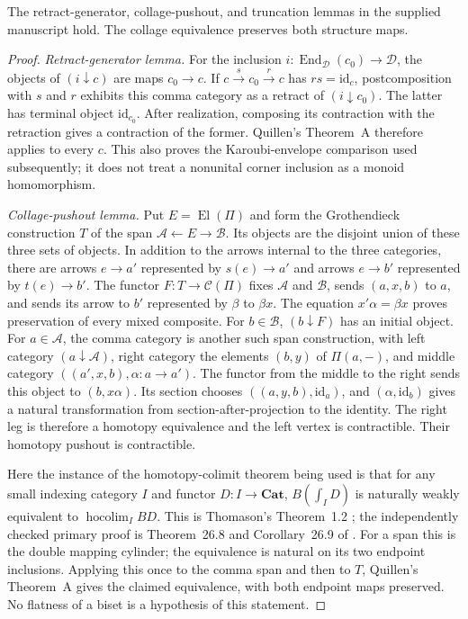 \begin{lemma}\label{lem:B-prelim}
The retract-generator, collage-pushout, and truncation lemmas in the
supplied manuscript hold.  The collage equivalence preserves both
structure maps.
\end{lemma}
\begin{proof}
\emph{Retract-generator lemma.}  For the inclusion
$i:\operatorname{End}_{\mathcal D}(c_0)\to\mathcal D$, the objects of
$(i\downarrow c)$ are maps $c_0\to c$.  If
$c\xrightarrow{s}c_0\xrightarrow{r}c$ has $rs=\mathrm{id}_c$,
postcomposition with $s$ and $r$ exhibits this comma category as a
retract of $(i\downarrow c_0)$.  The latter has terminal object
$\mathrm{id}_{c_0}$.  After realization, composing its contraction with
the retraction gives a contraction of the former.  Quillen's Theorem~A
therefore applies to every $c$.  This also proves the Karoubi-envelope
comparison used subsequently; it does not treat a nonunital corner
inclusion as a monoid homomorphism.

\emph{Collage-pushout lemma.}  Put $E=\operatorname{El}(\Pi)$ and form
the Grothendieck construction $T$ of the span
$\mathcal A\leftarrow E\to\mathcal B$.  Its objects are the disjoint
union of these three sets of objects.  In addition to the arrows internal
to the three categories, there are arrows $e\to a'$ represented by
$s(e)\to a'$ and arrows $e\to b'$ represented by $t(e)\to b'$.
The functor $F:T\to\mathcal C(\Pi)$ fixes $\mathcal A$ and
$\mathcal B$, sends $(a,x,b)$ to $a$, and sends its arrow to $b'$
represented by $\beta$ to $\beta x$.  The equation
$x'\alpha=\beta x$ proves preservation of every mixed composite.
For $b\in\mathcal B$, $(b\downarrow F)$ has an initial object.
For $a\in\mathcal A$, the comma category is another such span
construction, with left category $(a\downarrow\mathcal A)$,
right category the elements $(b,y)$ of $\Pi(a,-)$, and middle category
$((a',x,b),\alpha:a\to a')$.  The functor from the middle to the right
sends this object to $(b,x\alpha)$.  Its section chooses
$((a,y,b),\mathrm{id}_a)$, and $(\alpha,\mathrm{id}_b)$ gives a
natural transformation from section-after-projection to the identity.
The right leg is therefore a homotopy equivalence and the left vertex is
contractible.  Their homotopy pushout is contractible.

Here the instance of the homotopy-colimit theorem being used is that
for any small indexing category $I$ and functor $D:I\to\mathbf{Cat}$,
$B(\int_I D)$ is naturally weakly equivalent to
$\operatorname{hocolim}_I BD$.  This is Thomason's Theorem~1.2
\cite{Thomason1979B}; the independently checked primary proof is
Theorem~26.8 and Corollary~26.9 of \cite{ChacholskiScherer2002B}.
For a span this is the double mapping
cylinder; the equivalence is natural on its two endpoint inclusions.
Applying this once to the comma span and then to $T$, Quillen's
Theorem~A gives the claimed equivalence, with both endpoint maps
preserved.  No flatness of a biset is a hypothesis of this statement.


\end{proof}
